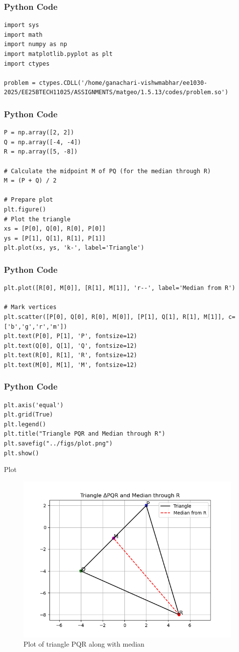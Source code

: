 \documentclass{beamer}
\begin{document}
\begin{frame}[fragile]
    \frametitle{Python Code}
    \begin{lstlisting}
import sys
import math
import numpy as np
import matplotlib.pyplot as plt
import ctypes

problem = ctypes.CDLL('/home/ganachari-vishwmabhar/ee1030-2025/EE25BTECH11025/ASSIGNMENTS/matgeo/1.5.13/codes/problem.so')
    \end{lstlisting}
\end{frame}

\begin{frame}[fragile]
    \frametitle{Python Code}
    \begin{lstlisting}
P = np.array([2, 2])
Q = np.array([-4, -4])
R = np.array([5, -8])

# Calculate the midpoint M of PQ (for the median through R)
M = (P + Q) / 2

# Prepare plot
plt.figure()
# Plot the triangle
xs = [P[0], Q[0], R[0], P[0]]
ys = [P[1], Q[1], R[1], P[1]]
plt.plot(xs, ys, 'k-', label='Triangle')
    \end{lstlisting}
\end{frame}

\begin{frame}[fragile]
    \frametitle{Python Code}
    \begin{lstlisting}
plt.plot([R[0], M[0]], [R[1], M[1]], 'r--', label='Median from R')

# Mark vertices
plt.scatter([P[0], Q[0], R[0], M[0]], [P[1], Q[1], R[1], M[1]], c=['b','g','r','m'])
plt.text(P[0], P[1], 'P', fontsize=12)
plt.text(Q[0], Q[1], 'Q', fontsize=12)
plt.text(R[0], R[1], 'R', fontsize=12)
plt.text(M[0], M[1], 'M', fontsize=12)
    \end{lstlisting}
\end{frame}

\begin{frame}[fragile]
    \frametitle{Python Code}
    \begin{lstlisting}
plt.axis('equal')
plt.grid(True)
plt.legend()
plt.title("Triangle PQR and Median through R")
plt.savefig("../figs/plot.png")
plt.show()
    \end{lstlisting}
\end{frame}

\begin{frame}{Plot}
    \begin{figure}
        \centering
        \includegraphics[width=0.5\columnwidth]{../figs/plot.png}
        \caption{Plot of triangle PQR along with median}
        \label{fig:fig}
    \end{figure}
\end{frame}
\end{document}
